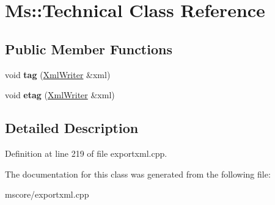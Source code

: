 \hypertarget{class_ms_1_1_technical}{}\section{Ms\+:\+:Technical Class Reference}
\label{class_ms_1_1_technical}
\subsection*{Public Member Functions}
\begin{DoxyCompactItemize}
\item 
\mbox{\label{class_ms_1_1_technical_a762ffddd21bf3e5dfbd83a87b972183b}} 
void {\bfseries tag} (\hyperlink{class_ms_1_1_xml_writer}{Xml\+Writer} \&xml)
\item 
\mbox{\label{class_ms_1_1_technical_a6fb25c270048bc29fb70089f7780e558}} 
void {\bfseries etag} (\hyperlink{class_ms_1_1_xml_writer}{Xml\+Writer} \&xml)
\end{DoxyCompactItemize}


\subsection{Detailed Description}


Definition at line 219 of file exportxml.\+cpp.



The documentation for this class was generated from the following file\+:\begin{DoxyCompactItemize}
\item 
mscore/exportxml.\+cpp\end{DoxyCompactItemize}
